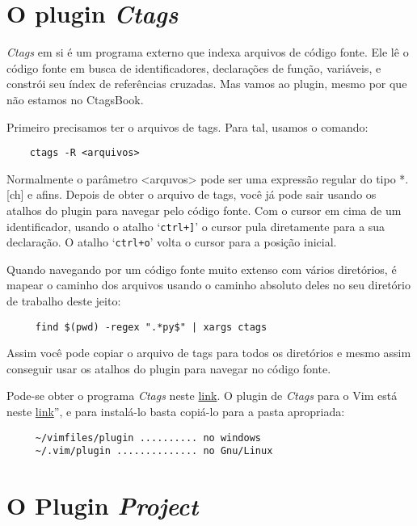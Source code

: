 \section{O plugin {\em Ctags}}
\label{sec:O Plugin Ctags}

{\em Ctags} em si é um programa externo que indexa arquivos de código fonte. Ele lê
o código fonte em busca de identificadores, declarações de função, variáveis, e constrói seu 
índex de referências cruzadas. Mas vamos ao plugin, mesmo por que não estamos no CtagsBook.

Primeiro precisamos ter o arquivos de tags. Para tal, usamos o comando:

\begin{verbatim}
    ctags -R <arquivos>
\end{verbatim}

Normalmente o parâmetro <arquvos> pode ser uma expressão regular do tipo *.[ch]
e afins. Depois de obter o arquivo de tags, você já pode sair usando os atalhos
do plugin para navegar pelo código fonte.  Com o cursor em cima de um
identificador, usando o atalho `\verb|ctrl+]|' o cursor pula diretamente para a
sua declaração. O atalho `\verb|ctrl+o|' volta o cursor para a posição inicial.

{\Large {}} Quando navegando por um código
fonte muito extenso com vários diretórios, é mapear o caminho dos arquivos
usando o caminho absoluto deles no seu diretório de trabalho deste jeito:

\begin{verbatim}
     find $(pwd) -regex ".*py$" | xargs ctags
\end{verbatim}

Assim você pode copiar o arquivo de tags para todos os diretórios e mesmo assim conseguir usar 
os atalhos do plugin para navegar no código fonte.

Pode-se obter o programa {\em Ctags} neste
\href{http://ctags.sourceforge.net/}{link}. O plugin de {\em Ctags} para o Vim está neste 
\href{http://vim.sourceforge.net/scripts/script.php?script\_id=12}{link}'', 
e para instalá-lo basta copiá-lo para a pasta apropriada:
    
\begin{verbatim}
     ~/vimfiles/plugin .......... no windows
     ~/.vim/plugin .............. no Gnu/Linux
\end{verbatim}


\section{O Plugin {\em Project}}

